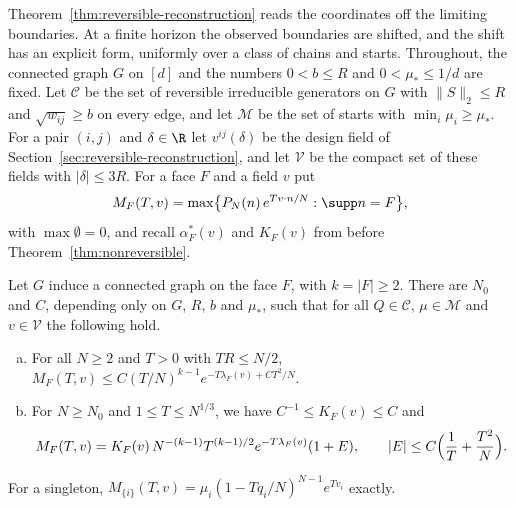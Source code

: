 Theorem~\ref{thm:reversible-reconstruction} reads the coordinates off the
limiting boundaries. At a finite horizon the observed boundaries are shifted,
and the shift has an explicit form, uniformly over a class of chains and
starts. Throughout, the connected graph $G$ on $[d]$ and the numbers $0<b\le R$
and $0<\mu_*\le1/d$ are fixed. Let $\mathcal C$ be the set of reversible
irreducible generators on $G$ with $\|S\|_2\le R$ and $\sqrt{w_{ij}}\ge b$ on
every edge, and let $\mathcal M$ be the set of starts with
$\min_i\mu_i\ge\mu_*$. For a pair $(i,j)$ and $\delta\in\R$ let $v^{ij}(\delta)$
be the design field of Section~\ref{sec:reversible-reconstruction}, and let
$\mathcal V$ be the compact set of these fields with $|\delta|\le3R$. For a
face $F$ and a field $v$ put
\[
 M_F(T,v)=\max\bigl\{P_N(n)\,e^{Tv\cdot n/N}:\supp n=F\bigr\},
\]
with $\max\emptyset=0$, and recall $\alpha^*_F(v)$ and $K_F(v)$ from before
Theorem~\ref{thm:nonreversible}.

\begin{proposition}\label{prop:uniform-facemax}
Let $G$ induce a connected graph on the face $F$, with $k=|F|\ge2$. There are
$N_0$ and $C$, depending only on $G$, $R$, $b$ and $\mu_*$, such that for all
$Q\in\mathcal C$, $\mu\in\mathcal M$ and $v\in\mathcal V$ the following hold.
\begin{enumerate}[(a)]
\item For all $N\ge2$ and $T>0$ with $TR\le N/2$,
$M_F(T,v)\le C(T/N)^{k-1}e^{-T\lambda_F(v)+CT^2/N}$.
\item For $N\ge N_0$ and $1\le T\le N^{1/3}$, we have $C^{-1}\le K_F(v)\le C$ and
\[
 M_F(T,v)=K_F(v)\,N^{-(k-1)}T^{(k-1)/2}e^{-T\lambda_F(v)}(1+E),\qquad
 |E|\le C\Bigl(\frac1T+\frac{T^2}N\Bigr).
\]
\end{enumerate}
For a singleton, $M_{\{i\}}(T,v)=\mu_i(1-Tq_i/N)^{N-1}e^{Tv_i}$ exactly.
\end{proposition}

